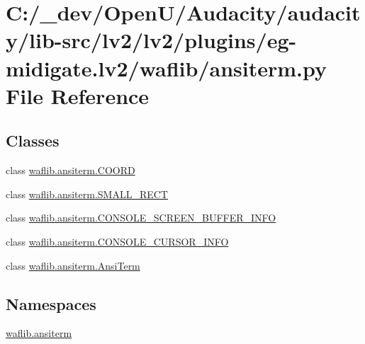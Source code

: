 \hypertarget{lv2_2plugins_2eg-midigate_8lv2_2waflib_2ansiterm_8py}{}\section{C\+:/\+\_\+dev/\+Open\+U/\+Audacity/audacity/lib-\/src/lv2/lv2/plugins/eg-\/midigate.lv2/waflib/ansiterm.py File Reference}
\label{lv2_2plugins_2eg-midigate_8lv2_2waflib_2ansiterm_8py}
\subsection*{Classes}
\begin{DoxyCompactItemize}
\item 
class \hyperlink{classwaflib_1_1ansiterm_1_1_c_o_o_r_d}{waflib.\+ansiterm.\+C\+O\+O\+RD}
\item 
class \hyperlink{classwaflib_1_1ansiterm_1_1_s_m_a_l_l___r_e_c_t}{waflib.\+ansiterm.\+S\+M\+A\+L\+L\+\_\+\+R\+E\+CT}
\item 
class \hyperlink{classwaflib_1_1ansiterm_1_1_c_o_n_s_o_l_e___s_c_r_e_e_n___b_u_f_f_e_r___i_n_f_o}{waflib.\+ansiterm.\+C\+O\+N\+S\+O\+L\+E\+\_\+\+S\+C\+R\+E\+E\+N\+\_\+\+B\+U\+F\+F\+E\+R\+\_\+\+I\+N\+FO}
\item 
class \hyperlink{classwaflib_1_1ansiterm_1_1_c_o_n_s_o_l_e___c_u_r_s_o_r___i_n_f_o}{waflib.\+ansiterm.\+C\+O\+N\+S\+O\+L\+E\+\_\+\+C\+U\+R\+S\+O\+R\+\_\+\+I\+N\+FO}
\item 
class \hyperlink{classwaflib_1_1ansiterm_1_1_ansi_term}{waflib.\+ansiterm.\+Ansi\+Term}
\end{DoxyCompactItemize}
\subsection*{Namespaces}
\begin{DoxyCompactItemize}
\item 
 \hyperlink{namespacewaflib_1_1ansiterm}{waflib.\+ansiterm}
\end{DoxyCompactItemize}
